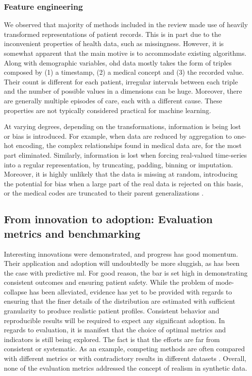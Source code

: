 \subsubsection{Feature engineering}
We observed that majority of methods included in the review made use of heavily transformed representations of patient records. This is in part due to the inconvenient properties of health data, such as missingness. However, it is somewhat apparent that the main motive is to accommodate existing algorithms. Along with demographic variables, \gls{ohd} data mostly takes the form of triples composed by (1) a timestamp, (2) a medical concept and (3) the recorded value. Their count is different for each patient, irregular intervals between each triple and the number of possible values in a dimensions can be huge. Moreover, there are generally multiple episodes of care, each with a different cause. These properties are not typically considered practical for machine learning. \par

At varying degrees, depending on the transformations, information is being lost or bias is introduced. For example, when data are reduced by aggregation to one-hot encoding, the complex relationships found in medical data are, for the most part eliminated. Similarly, information is lost when forcing real-valued time-series into a regular representation, by truncating, padding, binning or imputation. Moreover, it is highly unlikely that the data is missing at random, introducing the potential for bias when a large part of the real data is rejected on this basis, or the medical codes are truncated to their parent generalizations \cite{Zhang2020, Choi2017-nt}. 

\subsection{From innovation to adoption: Evaluation metrics and benchmarking}
Interesting innovations were demonstrated, and progress has good momentum. Their application and adoption will undoubtedly be more sluggish, as has been the case with predictive \gls{ml}. For good reason, the bar is set high in demonstrating consistent outcomes and ensuring patient safety. While the problem of \gls{mode-collapse} has been alleviated, evidence has yet to be provided with regards to ensuring that the finer details of the distribution are estimated with sufficient granularity to produce realistic patient profiles. Consistent behavior and reproducible results will be required to expect any significant adoption. In regards to evaluation, it is manifest that the choice of optimal metrics and indicators is still being explored. The fact is that the efforts are far from consistent or systematic. As an example, competing methods are often compared with different metrics or with contradictory results in different datasets \cite{baowaly_2019_IEEE,baowaly_2019_jamia,Camino2018-re,Choi2017-nt,Zhang2020}. Overall, none of the evaluation metrics addressed the concept of realism in synthetic data.\par

